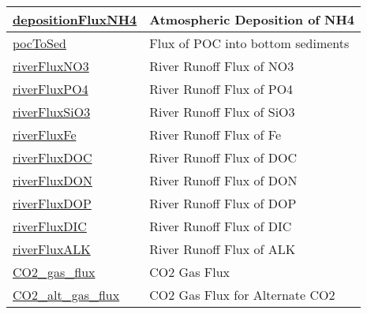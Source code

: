 {\begin{center}
\begin{longtable}{| p{2.0in} | p{4.0in} |}
    \hline
    \hyperref[subsec:var_sec_ecosysAuxiliary_depositionFluxNH4]{depositionFluxNH4} & Atmospheric Deposition of NH4 \\
    \hline
    \hyperref[subsec:var_sec_ecosysAuxiliary_pocToSed]{pocToSed} & Flux of POC into bottom sediments \\
    \hline
    \hyperref[subsec:var_sec_ecosysAuxiliary_riverFluxNO3]{riverFluxNO3} & River Runoff Flux of NO3 \\
    \hline
    \hyperref[subsec:var_sec_ecosysAuxiliary_riverFluxPO4]{riverFluxPO4} & River Runoff Flux of PO4 \\
    \hline
    \hyperref[subsec:var_sec_ecosysAuxiliary_riverFluxSiO3]{riverFluxSiO3} & River Runoff Flux of SiO3 \\
    \hline
    \hyperref[subsec:var_sec_ecosysAuxiliary_riverFluxFe]{riverFluxFe} & River Runoff Flux of Fe \\
    \hline
    \hyperref[subsec:var_sec_ecosysAuxiliary_riverFluxDOC]{riverFluxDOC} & River Runoff Flux of DOC \\
    \hline
    \hyperref[subsec:var_sec_ecosysAuxiliary_riverFluxDON]{riverFluxDON} & River Runoff Flux of DON \\
    \hline
    \hyperref[subsec:var_sec_ecosysAuxiliary_riverFluxDOP]{riverFluxDOP} & River Runoff Flux of DOP \\
    \hline
    \hyperref[subsec:var_sec_ecosysAuxiliary_riverFluxDIC]{riverFluxDIC} & River Runoff Flux of DIC \\
    \hline
    \hyperref[subsec:var_sec_ecosysAuxiliary_riverFluxALK]{riverFluxALK} & River Runoff Flux of ALK \\
    \hline
    \hyperref[subsec:var_sec_ecosysAuxiliary_CO2_gas_flux]{CO2\_gas\_flux} & CO2 Gas Flux \\
    \hline
    \hyperref[subsec:var_sec_ecosysAuxiliary_CO2_alt_gas_flux]{CO2\_alt\_gas\_flux} & CO2 Gas Flux for Alternate CO2 \\
    \hline
\end{longtable}
\end{center}
}
